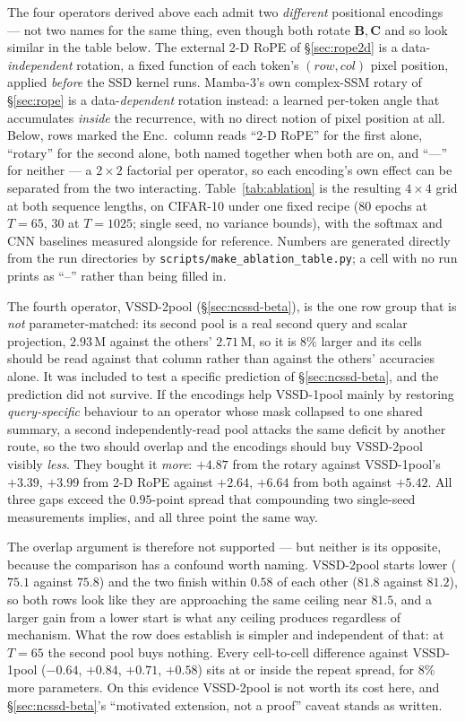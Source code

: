 \documentclass[11pt,a4paper]{article}
\begin{document}
The four operators derived above each admit two \emph{different} positional
encodings --- not two names for the same thing, even though both rotate
$\bm{B},\bm{C}$ and so look similar in the table below. The external 2-D RoPE of
\S\ref{sec:rope2d} is a data-\emph{independent} rotation, a fixed function of each
token's $(row,col)$ pixel position, applied \emph{before} the SSD kernel runs.
Mamba-3's own complex-SSM rotary of \S\ref{sec:rope} is a data-\emph{dependent}
rotation instead: a learned per-token angle that accumulates \emph{inside} the
recurrence, with no direct notion of pixel position at all. Below, rows marked
the Enc.\ column reads ``2-D RoPE'' for the first alone, ``rotary'' for the second
alone, both named together when both are on, and ``---'' for neither --- a
$2\times2$ factorial per operator, so each encoding's own effect can be separated
from the two interacting.
Table~\ref{tab:ablation} is the resulting $4\times4$ grid at
both sequence lengths, on CIFAR-10 under one fixed recipe (80 epochs at $T{=}65$,
30 at $T{=}1025$; single seed, no variance bounds), with the softmax and CNN
baselines measured alongside for reference. Numbers are generated directly from
the run directories by \texttt{scripts/\allowbreak{}make\_\allowbreak{}ablation\_\allowbreak{}table.py}; a cell with no
run prints as ``--'' rather than being filled in.

The fourth operator, VSSD-2pool (\S\ref{sec:ncssd-beta}), is the one row
group that is \emph{not} parameter-matched: its second pool is a real second query
and scalar projection, $2.93$\,M against the others' $2.71$\,M, so it is $8\%$
larger and its cells should be read against that column rather than against the
others' accuracies alone. It was included to test a specific prediction of
\S\ref{sec:ncssd-beta}, and the prediction did not survive. If the encodings help
VSSD-1pool mainly by restoring \emph{query-specific} behaviour to an operator
whose mask collapsed to one shared summary, a second independently-read pool attacks
the same deficit by another route, so the two should overlap and the encodings should
buy VSSD-2pool visibly \emph{less}. They bought it \emph{more}: $+4.87$ from
the rotary against VSSD-1pool's $+3.39$, $+3.99$ from 2-D RoPE against $+2.64$,
$+6.64$ from both against $+5.42$. All three gaps exceed the $0.95$-point spread that
compounding two single-seed measurements implies, and all three point the same way.

The overlap argument is therefore not supported --- but neither is its opposite,
because the comparison has a confound worth naming. VSSD-2pool starts lower
($75.1$ against $75.8$) and the two finish within $0.58$ of each other ($81.8$
against $81.2$), so both rows look like they are approaching the same ceiling near
$81.5$, and a larger gain from a lower start is what any ceiling produces regardless
of mechanism. What the row does establish is simpler and independent of that: at
$T{=}65$ the second pool buys nothing. Every cell-to-cell difference against
VSSD-1pool ($-0.64$, $+0.84$, $+0.71$, $+0.58$) sits at or inside the repeat
spread, for $8\%$ more parameters. On this evidence VSSD-2pool is not worth
its cost here, and \S\ref{sec:ncssd-beta}'s ``motivated extension, not a proof''
caveat stands as written.
\end{document}
